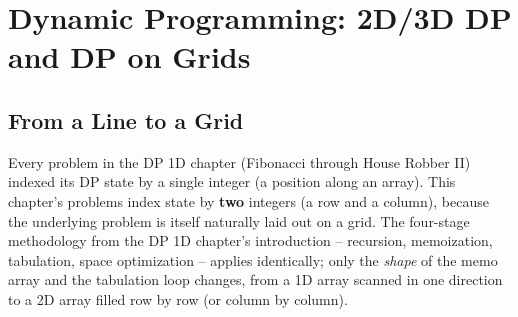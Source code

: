 \chapter{Dynamic Programming: 2D/3D DP and DP on Grids}

\section{From a Line to a Grid}
\label{sec:dp-grids-intro}

Every problem in the DP 1D chapter (Fibonacci through House Robber II)
indexed its DP state by a single integer (a position along an array).
This chapter's problems index state by \textbf{two} integers (a row and
a column), because the underlying problem is itself naturally laid out on
a grid. The four-stage methodology from the DP 1D chapter's introduction --
recursion, memoization, tabulation, space optimization -- applies
identically; only the \emph{shape} of the memo array and the tabulation
loop changes, from a 1D array scanned in one direction to a 2D array
filled row by row (or column by column).

